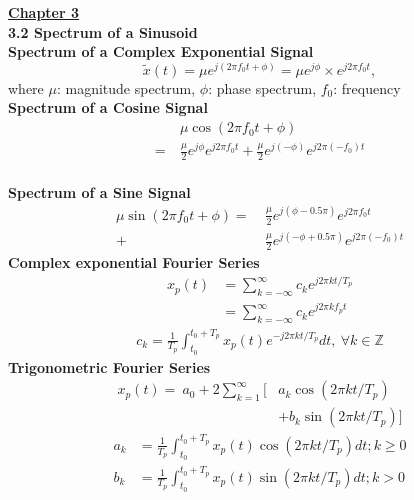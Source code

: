 \documentclass[6pt,landscape,a4paper]{extarticle}
\begin{document}
\begin{multicols*}{5}
    \textbf{\uline{Chapter 3}}\\
    \textbf{3.2 Spectrum of a Sinusoid}\\
    \textbf{Spectrum of a Complex Exponential Signal}
    \[
        \tilde{x}(t)=\mu e^{j(2\pi f_0t+\phi)} = \mu e^{j\phi} \times e^{j2\pi f_0t},
    \]where $\mu$: magnitude spectrum, $\phi$: phase spectrum, $f_0$: frequency\\
    \textbf{Spectrum of a Cosine Signal}
    \begin{align*}
        &\mu \cos(2\pi f_0t + \phi)\\
        = \ &\frac{\mu}{2}e^{j\phi}e^{j2\pi f_0t} + \frac{\mu}{2}  e^{j(-\phi)}e^{j2\pi (-f_0)t}
    \end{align*}\\
    \textbf{Spectrum of a Sine Signal}
    \begin{align*}
        \mu\sin(2\pi f_0 t + \phi)
        =\ &\frac{\mu}{2}e^{j(\phi - 0.5\pi)}e^{j2\pi f_0t} \\
        + \ &\frac{\mu}{2}e^{j(-\phi+0.5\pi)}e^{j2\pi (-f_0)t}
    \end{align*}
    \textbf{Complex exponential Fourier Series}
    \begin{align*}
        x_p(t)&=\sum_{k=-\infty}^{\infty}c_ke^{j2\pi kt/T_p}\\
        &=\sum_{k=-\infty}^{\infty}c_ke^{j2\pi kf_pt} \tag{3.1a}
    \end{align*}
    \begin{align*}
        c_k=\frac{1}{T_p}\int_{t_0}^{t_0+T_p}x_p(t)e^{-j2\pi kt/T_p}dt,\ \forall k \in \mathbb{Z} \tag{3.1b}
    \end{align*}
    \textbf{Trigonometric Fourier Series}
    \begin{align*}
        x_p(t) = \ a_0 + 2\sum_{k=1}^{\infty} [ &a_k \cos(2\pi kt/T_p) \\
        &+ b_k \sin(2\pi kt/T_p)]
    \end{align*}
    \begin{align*}
        a_k&=\frac{1}{T_p}\int_{t_0}^{t_0+T_p}x_p(t)\cos(2\pi kt/T_p)dt; k \geq 0\\
        b_k&=\frac{1}{T_p}\int_{t_0}^{t_0+T_p}x_p(t)\sin(2\pi kt/T_p)dt; k > 0
        \tag{3.2}
    \end{align*}


\end{multicols*}
\end{document}
